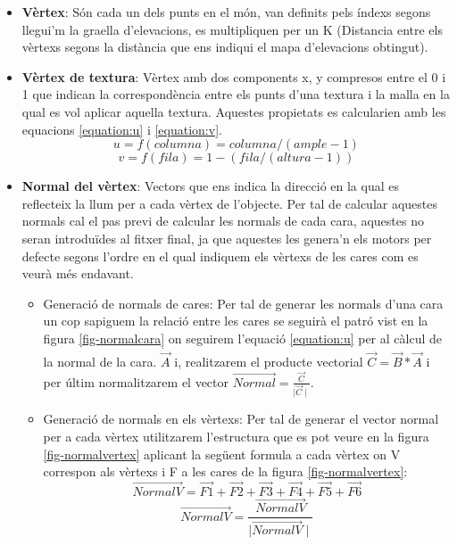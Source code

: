 \documentclass[10pt,a4paper,twocolumn,twoside]{article}
\begin{document}
\begin{itemize}
  \item \textbf{Vèrtex}: Són cada un dels punts en el món, van definits pels índexs segons llegui'm la graella d'elevacions, es multipliquen per un K (Distancia entre els vèrtexs segons la distància que ens indiqui el mapa d'elevacions obtingut).

  \item {
    \textbf{Vèrtex de textura}: Vèrtex amb dos components x, y compresos entre el 0 i 1 que indican la correspondència entre els punts d'una textura i la malla en la qual es vol aplicar aquella textura. Aquestes propietats es calcularien amb les equacions \ref{equation:u} i \ref{equation:v}.
    \begin{equation}
    \label{equation:u}
    u = f(columna) = columna / (ample - 1)
    \end{equation}
    \begin{equation}
    \label{equation:v}
    v = f(fila) = 1 - (fila / (altura - 1))
    \end{equation}
  }

  \item \textbf{Normal del vèrtex}: Vectors que ens indica la direcció en la qual es reflecteix la llum per a cada vèrtex de l'objecte. Per tal de calcular aquestes normals cal el pas previ de calcular les normals de cada cara, aquestes no seran introduïdes al fitxer final, ja que aquestes les genera'n els motors per defecte segons l'ordre en el qual indiquem els vèrtexs de les cares com es veurà més endavant.
  \begin{itemize}
    \item {
       Generació de normals de cares: Per tal de generar les normals d'una cara un cop sapiguem la relació entre les cares se seguirà el patró vist en la figura \ref{fig-normalcara} on seguirem l'equació \ref{equation:u} per al càlcul de la normal de la cara. $\dot{\vec{A}}$ i, realitzarem el producte vectorial $\vec{C} = \vec{B}*\vec{A}$ i per últim normalitzarem el vector $\vec{Normal} = \frac{\vec{C}}{\mid\vec{C}\mid}$.
    }
    \item {
      Generació de normals en els vèrtexs: Per tal de generar el vector normal per a cada vèrtex utilitzarem l'estructura que es pot veure en la figura \ref{fig-normalvertex} aplicant la següent formula a cada vèrtex on V correspon als vèrtexs i F a les cares de la figura \ref{fig-normalvertex}:
      \begin{equation}
      \vec{NormalV} = \vec{F1} + \vec{F2} + \vec{F3} + \vec{F4} + \vec{F5} + \vec{F6}
      \end{equation}
      \begin{equation}
      \vec{NormalV} = \frac{\vec{NormalV}}{\mid\vec{NormalV}\mid}
      \end{equation}
    }
  \end{itemize}


\end{itemize}
\end{document}
